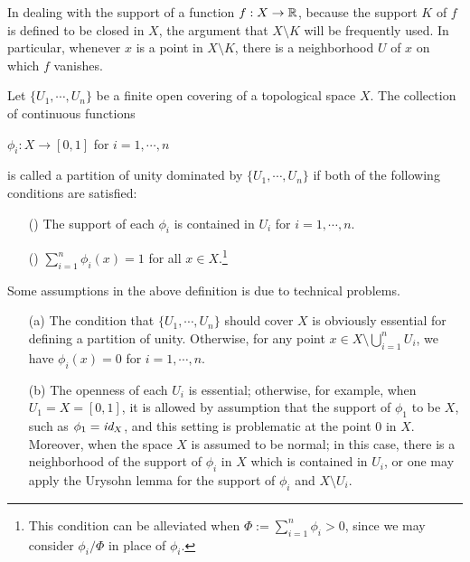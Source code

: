 In dealing with the support of a function $f: X\rightarrow {\mathbb{R}}$, because the support $K$ of $f$ is defined to be closed in $X$, the argument that $X\setminus K$ will be frequently used.
In particular, whenever $x$ is a point in $X\setminus K$, there is a neighborhood $U$ of $x$ on which $f$ vanishes.

\begin{defi}
    Let $\{U_1, \cdots, U_n\}$ be a finite open covering of a topological space $X$.
    The collection of continuous functions
    \begin{center}
        $\phi_i: X\rightarrow [0, 1]$ for $i=1, \cdots, n$
    \end{center}
    is called a partition of unity dominated by $\{U_1, \cdots, U_n\}$ if both of the following conditions are satisfied:
    \begin{enumerate}
        \item[(\romannumeral 1)]
        {
            The support of each $\phi_i$ is contained in $U_i$ for $i=1, \cdots, n$.
        }
        \item[(\romannumeral 2)]
        {
            $\sum_{i=1}^n \phi_i(x)=1$ for all $x\in X$.\footnote{This condition can be alleviated when $\Phi:=\sum_{i=1}^n \phi_i>0$, since we may consider $\phi_i/\Phi$ in place of $\phi_i$.}
        }
    \end{enumerate}
\end{defi}
\begin{rmk}
    Some assumptions in the above definition is due to technical problems.
    \begin{enumerate}
        \item[(a)]
        {
            The condition that $\{U_1, \cdots, U_n\}$ should cover $X$ is obviously essential for defining a partition of unity.
            Otherwise, for any point $x\in X\setminus\bigcup_{i=1}^n U_i$, we have $\phi_i(x)=0$ for $i=1, \cdots, n$.
        }
        \item[(b)]
        {
            The openness of each $U_i$ is essential; otherwise, for example, when $U_1=X=[0, 1]$, it is allowed by assumption that the support of $\phi_1$ to be $X$, such as $\phi_1=\textit{id}_{X}$, and this setting is problematic at the point 0 in $X$.
            Moreover, when the space $X$ is assumed to be normal; in this case, there is a neighborhood of the support of $\phi_i$ in $X$ which is contained in $U_i$, or one may apply the Urysohn lemma for the support of $\phi_i$ and $X\setminus U_i$.
        }
    \end{enumerate}
\end{rmk}

